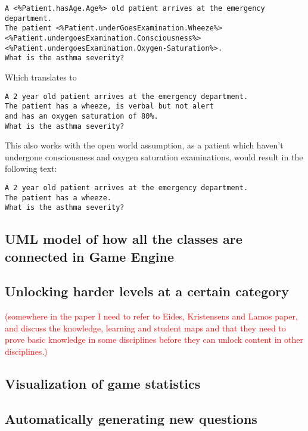 \begin{verbatim}
A <%Patient.hasAge.Age%> old patient arrives at the emergency department. 
The patient <%Patient.underGoesExamination.Wheeze%> 
<%Patient.undergoesExamination.Consciousness%> 
<%Patient.undergoesExamination.Oxygen-Saturation%>. 
What is the asthma severity? 
\end{verbatim}

Which translates to 
\begin{verbatim}
A 2 year old patient arrives at the emergency department. 
The patient has a wheeze, is verbal but not alert 
and has an oxygen saturation of 80%. 
What is the asthma severity? 
\end{verbatim}

This also works with the open world assumption, as a patient which haven't undergone consciousness and oxygen saturation examinations, would result in the following text:

\begin{verbatim}
A 2 year old patient arrives at the emergency department. 
The patient has a wheeze. 
What is the asthma severity? 
\end{verbatim}


\subsection{UML model of how all the classes are connected in Game Engine}

\subsection{Unlocking harder levels at a certain category}
\textcolor{red}{(somewhere in the paper I need to refer to Eides, Kristensens and Lamos paper, and discuss the knowledge, learning and student maps and that they need to prove basic knowledge in some disciplines before they can unlock content in other disciplines.)}
\subsection{Visualization of game statistics}
\subsection{Automatically generating new questions}
